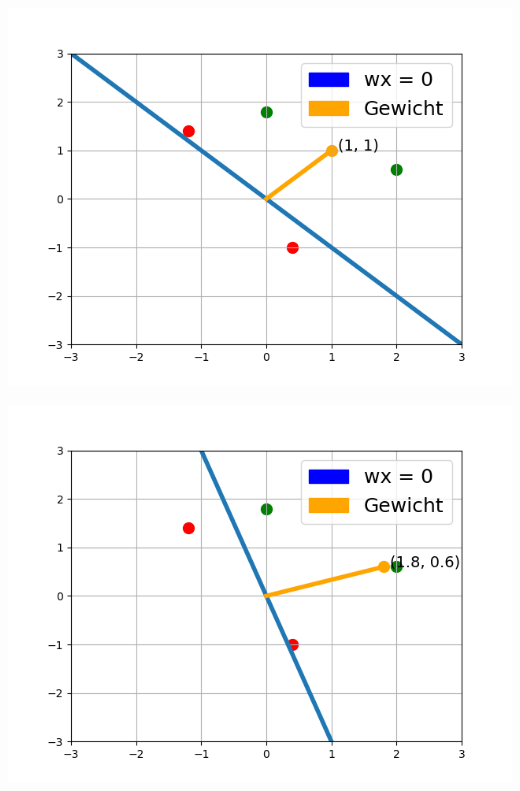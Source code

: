 \documentclass[fontsize=11pt]{scrartcl}
\newenvironment{Figure}
  {\par\medskip\noindent\minipage{\linewidth}}
  {\endminipage\par\medskip}
\begin{document}
                        \begin{Figure}
                            \begin{minipage}[b]{.4\linewidth}
                                \includegraphics[scale=0.5]{bsp1.png}
                            \end{minipage}
                            \hspace{.1\linewidth}
                            \begin{minipage}[b]{.4\linewidth}
                                \includegraphics[scale=0.5]{bsp2.png}
                            \end{minipage}
                        \end{Figure}
\end{document}
